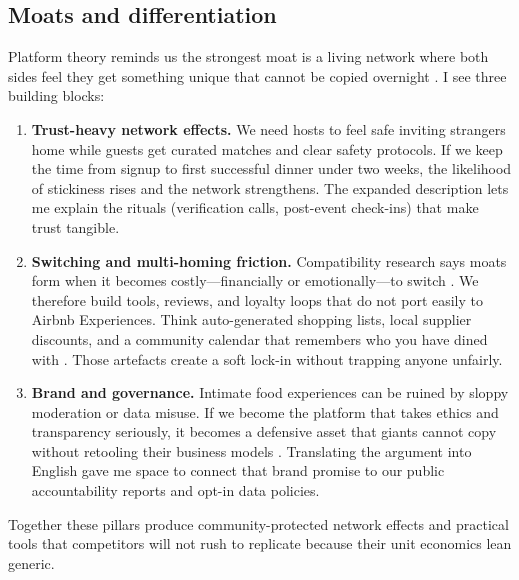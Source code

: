 \subsection*{Moats and differentiation}
Platform theory reminds us the strongest moat is a living network where both sides feel they get something unique that cannot be copied overnight \citep{Choudary2016,Reillier2017}. I see three building blocks:
\begin{enumerate}
  \item \textbf{Trust-heavy network effects.} We need hosts to feel safe inviting strangers home while guests get curated matches and clear safety protocols. If we keep the time from signup to first successful dinner under two weeks, the likelihood of stickiness rises and the network strengthens. The expanded description lets me explain the rituals (verification calls, post-event check-ins) that make trust tangible.
  \item \textbf{Switching and multi-homing friction.} Compatibility research says moats form when it becomes costly---financially or emotionally---to switch \citep{FarrellSaloner1986}. We therefore build tools, reviews, and loyalty loops that do not port easily to Airbnb Experiences. Think auto-generated shopping lists, local supplier discounts, and a community calendar that remembers who you have dined with \citep{ShapiroVarian1999}. Those artefacts create a soft lock-in without trapping anyone unfairly.
  \item \textbf{Brand and governance.} Intimate food experiences can be ruined by sloppy moderation or data misuse. If we become the platform that takes ethics and transparency seriously, it becomes a defensive asset that giants cannot copy without retooling their business models \citep{Zuboff2019}. Translating the argument into English gave me space to connect that brand promise to our public accountability reports and opt-in data policies.
\end{enumerate}
Together these pillars produce community-protected network effects and practical tools that competitors will not rush to replicate because their unit economics lean generic.

